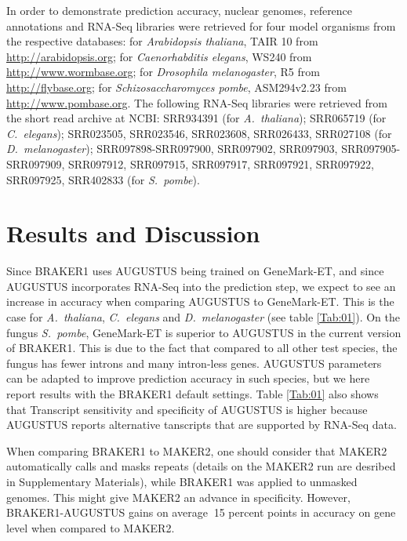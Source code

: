 \documentclass{bioinfo}
\begin{document}
\begin{methods}
In order to demonstrate prediction accuracy, nuclear genomes, reference annotations and RNA-Seq libraries were retrieved for four model organisms from the respective databases: for \textit{Arabidopsis thaliana}, TAIR 10 from \url{http://arabidopsis.org}; for \textit{Caenorhabditis elegans}, WS240 from \url{http://www.wormbase.org}; for \textit{Drosophila melanogaster}, R5 from \url{http://flybase.org}; for \textit{Schizosaccharomyces pombe}, ASM294v2.23 from \url{http://www.pombase.org}. The following RNA-Seq libraries were retrieved from the short read archive at NCBI: SRR934391 (for \textit{A.~thaliana}); SRR065719 (for \textit{C.~elegans}); SRR023505, SRR023546, SRR023608, SRR026433, SRR027108 (for \textit{D.~melanogaster}); SRR097898-SRR097900, SRR097902, SRR097903,
SRR097905-SRR097909, SRR097912, SRR097915, SRR097917, SRR097921, SRR097922, SRR097925, SRR402833 (for \textit{S.~pombe}).

\end{methods}


\section{Results and Discussion}

Since BRAKER1 uses AUGUSTUS being trained on GeneMark-ET, and since AUGUSTUS incorporates RNA-Seq into the prediction step, we expect to see an increase in accuracy when comparing AUGUSTUS to GeneMark-ET. This is the case for \textit{A.~thaliana}, \textit{C.~elegans} and \textit{D.~melanogaster} (see table \ref{Tab:01}). On the fungus \textit{S.~pombe}, GeneMark-ET is superior to AUGUSTUS in the current version of BRAKER1. This is due to the fact that compared to all other test species, the fungus has fewer introns and many intron-less genes. AUGUSTUS parameters can be adapted to improve prediction accuracy in such species, but we here report results with the BRAKER1 default settings. Table \ref{Tab:01} also shows that Transcript sensitivity and specificity of AUGUSTUS is higher because AUGUSTUS reports alternative tanscripts that are supported by RNA-Seq data. 

When comparing BRAKER1 to MAKER2, one should consider that MAKER2 automatically calls and masks repeats (details on the MAKER2 run are desribed in Supplementary Materials), while BRAKER1 was applied to unmasked genomes. This might give MAKER2 an advance in specificity. However, BRAKER1-AUGUSTUS gains on average $~$15 percent points in accuracy on gene level when compared to MAKER2. 
\end{document}

